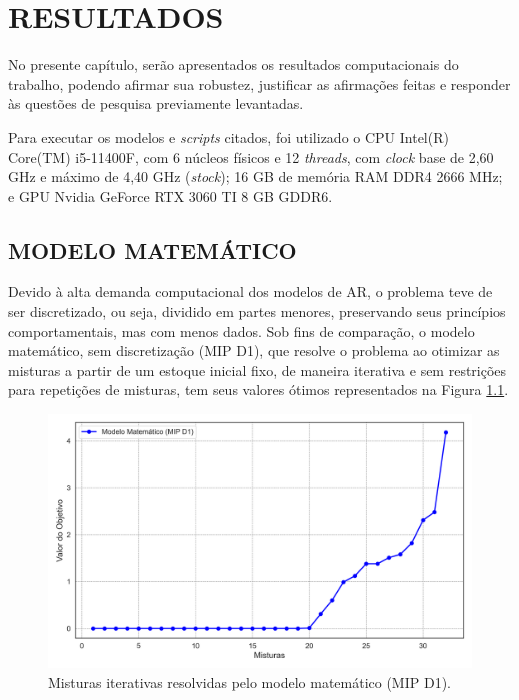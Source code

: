 \documentclass[
    12pt,                %
    openright,           %
    oneside,             %
    a4paper,             %
    english,             %
    spanish,             %
    brazil               %
]{ufscar}
\begin{document}
\chapter{RESULTADOS}

No presente capítulo, serão apresentados os resultados computacionais do trabalho, podendo afirmar sua robustez, justificar as afirmações feitas e responder às questões de pesquisa previamente levantadas.

Para executar os modelos e \textit{scripts} citados, foi utilizado o CPU Intel(R) Core(TM) i5-11400F, com 6 núcleos físicos e 12 \textit{threads}, com \textit{clock} base de 2,60 GHz e máximo de 4,40 GHz (\textit{stock}); 16 GB de memória RAM DDR4 2666 MHz; e GPU Nvidia GeForce RTX 3060 TI 8 GB GDDR6.

\section{MODELO MATEMÁTICO}

Devido à alta demanda computacional dos modelos de AR, o problema teve de ser discretizado, ou seja, dividido em partes menores, preservando seus princípios comportamentais, mas com menos dados. Sob fins de comparação, o modelo matemático, sem discretização (MIP D1), que resolve o problema ao otimizar as misturas a partir de um estoque inicial fixo, de maneira iterativa e sem restrições para repetições de misturas, tem seus valores ótimos representados na Figura \ref{figure:MM}.

\begin{figure}[hbt]
\centering
  \caption{Misturas iterativas resolvidas pelo modelo matemático (MIP D1).}  
  \label{figure:MM}
  \includegraphics[width=1\textwidth]{figures/ModeloMatematicoQk1D1.png}
\end{figure}
\end{document}
